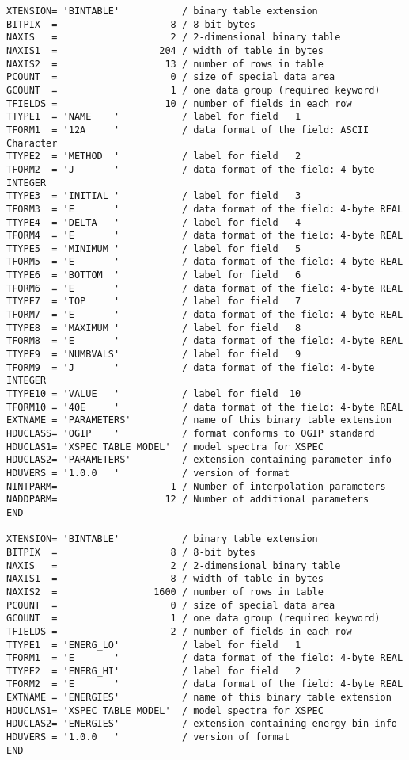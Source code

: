 \documentclass[11pt]{article}
\begin{document}
\begin{verbatim}
XTENSION= 'BINTABLE'           / binary table extension
BITPIX  =                    8 / 8-bit bytes
NAXIS   =                    2 / 2-dimensional binary table
NAXIS1  =                  204 / width of table in bytes
NAXIS2  =                   13 / number of rows in table
PCOUNT  =                    0 / size of special data area
GCOUNT  =                    1 / one data group (required keyword)
TFIELDS =                   10 / number of fields in each row
TTYPE1  = 'NAME    '           / label for field   1
TFORM1  = '12A     '           / data format of the field: ASCII Character
TTYPE2  = 'METHOD  '           / label for field   2
TFORM2  = 'J       '           / data format of the field: 4-byte INTEGER
TTYPE3  = 'INITIAL '           / label for field   3
TFORM3  = 'E       '           / data format of the field: 4-byte REAL
TTYPE4  = 'DELTA   '           / label for field   4
TFORM4  = 'E       '           / data format of the field: 4-byte REAL
TTYPE5  = 'MINIMUM '           / label for field   5
TFORM5  = 'E       '           / data format of the field: 4-byte REAL
TTYPE6  = 'BOTTOM  '           / label for field   6
TFORM6  = 'E       '           / data format of the field: 4-byte REAL
TTYPE7  = 'TOP     '           / label for field   7
TFORM7  = 'E       '           / data format of the field: 4-byte REAL
TTYPE8  = 'MAXIMUM '           / label for field   8
TFORM8  = 'E       '           / data format of the field: 4-byte REAL
TTYPE9  = 'NUMBVALS'           / label for field   9
TFORM9  = 'J       '           / data format of the field: 4-byte INTEGER
TTYPE10 = 'VALUE   '           / label for field  10
TFORM10 = '40E     '           / data format of the field: 4-byte REAL
EXTNAME = 'PARAMETERS'         / name of this binary table extension
HDUCLASS= 'OGIP    '           / format conforms to OGIP standard
HDUCLAS1= 'XSPEC TABLE MODEL'  / model spectra for XSPEC
HDUCLAS2= 'PARAMETERS'         / extension containing parameter info
HDUVERS = '1.0.0   '           / version of format
NINTPARM=                    1 / Number of interpolation parameters
NADDPARM=                   12 / Number of additional parameters
END
 
XTENSION= 'BINTABLE'           / binary table extension
BITPIX  =                    8 / 8-bit bytes
NAXIS   =                    2 / 2-dimensional binary table
NAXIS1  =                    8 / width of table in bytes
NAXIS2  =                 1600 / number of rows in table
PCOUNT  =                    0 / size of special data area
GCOUNT  =                    1 / one data group (required keyword)
TFIELDS =                    2 / number of fields in each row
TTYPE1  = 'ENERG_LO'           / label for field   1
TFORM1  = 'E       '           / data format of the field: 4-byte REAL
TTYPE2  = 'ENERG_HI'           / label for field   2
TFORM2  = 'E       '           / data format of the field: 4-byte REAL
EXTNAME = 'ENERGIES'           / name of this binary table extension
HDUCLAS1= 'XSPEC TABLE MODEL'  / model spectra for XSPEC
HDUCLAS2= 'ENERGIES'           / extension containing energy bin info
HDUVERS = '1.0.0   '           / version of format
END
 

\end{verbatim}
\end{document}
